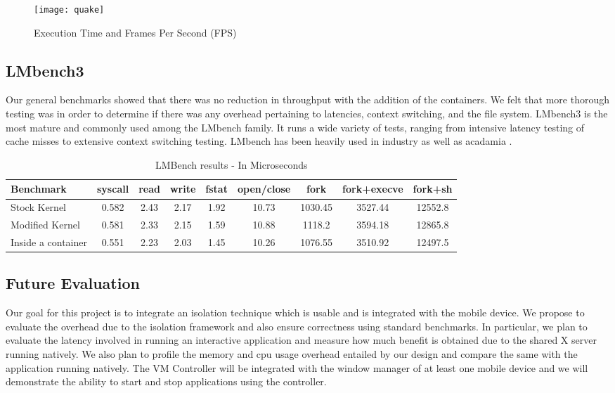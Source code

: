 \begin{figure}[tbh]
\centering
\texttt{[image: quake]}
\caption{Execution Time and Frames Per Second (FPS)}
\label{fig:Quake}
\end{figure}

\subsection{LMbench3}
Our general benchmarks showed that there was no reduction in throughput with the addition of the containers.  We felt that more thorough testing was in order to determine if there was any overhead pertaining to latencies, context switching, and the file system.  LMbench3 is the most mature and commonly used among the LMbench family.  It runs a wide variety of tests, ranging from intensive latency testing of cache misses to extensive context switching testing.  LMbench has been heavily used in industry as well as acadamia \cite{lmbench}.

\begin{table}[htb]
{\small
\hfill{}
\begin{tabular}{|l|c|c|c|c|c|c|c|c|}
\hline Benchmark & syscall & read & write & fstat & open/close & fork & fork+execve & fork+sh \\ 
\hline
Stock Kernel & 0.582 & 2.43 & 2.17 & 1.92 & 10.73 & 1030.45 & 3527.44 & 12552.8 \\
Modified Kernel & 0.581 & 2.33 & 2.15 & 1.59 & 10.88 & 1118.2 & 3594.18 & 12865.8 \\
Inside a container & 0.551 & 2.23 & 2.03 & 1.45 & 10.26 & 1076.55 & 3510.92 & 12497.5 \\ 
\hline 
\end{tabular}}
\hfill{}
\caption{ LMBench results - In Microseconds }
\label{tab:lmbench_results}
\end{table}

\subsection{Future Evaluation}

Our goal for this project is to integrate an isolation technique which is usable and is integrated with the mobile device. We propose to evaluate the overhead due to the isolation framework and also ensure correctness using standard benchmarks. In particular, we plan to evaluate the latency involved in running an interactive application and measure how much benefit is obtained due to the shared X server running natively. We also plan to profile the memory and cpu usage overhead entailed by our design and compare the same with the application running natively. The VM Controller will be integrated with the window manager of at least one mobile device and we will demonstrate the ability to start and stop applications using the controller.
